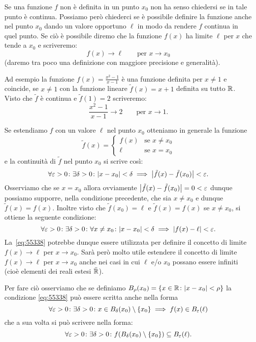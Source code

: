 Se una funzione $f$ non è definita in un punto $x_0$ non ha senso chiedersi
se in tale punto è continua. 
Possiamo però chiederci se è possibile definire la funzione anche nel punto 
$x_0$ dando un valore opportuno $\ell$ in modo da rendere $f$ continua 
in quel punto. 
Se ciò è possibile diremo che la funzione $f(x)$ ha limite $\ell$ 
per $x$ che tende a $x_0$ e scriveremo:
\[
  f(x) \to \ell \qquad \text{per $x\to x_0$}
\]
(daremo tra poco una definizione con maggiore precisione e generalità).

Ad esempio la funzione $f(x) = \frac{x^2-1}{x-1}$ è una funzione definita per $x\neq 1$
e coincide, se $x\neq 1$ con la funzione lineare $\tilde f(x) = x+1$ definita 
su tutto ${\mathbb R}$. 
Visto che $\tilde f$ è continua e $\tilde f(1)=2$
scriveremo:
\[
  \frac{x^2-1}{x-1} \to 2
  \qquad \text{per $x\to 1$.}
\]

Se estendiamo $f$ con un valore $\ell$ nel punto $x_0$ otteniamo 
in generale la funzione 
\[
  \tilde f(x) = \begin{cases}
    f(x) & \text{se $x\neq x_0$}\\
    \ell & \text{se $x=x_0$}
  \end{cases}  
\]
e la continuità di $\tilde f$ nel punto $x_0$ si scrive così:
\[
\forall\varepsilon>0\colon \exists \delta>0\colon
{\left|x-x_0\right|}<\delta \implies {\left|\tilde f(x)-\tilde f(x_0)\right|}<\varepsilon.  
\]
Osserviamo che se $x=x_0$ allora ovviamente ${\left|\tilde f(x)-\tilde f(x_0)\right|}
= 0 < \varepsilon$ dunque possiamo supporre, nella condizione precedente, 
che sia $x\neq x_0$ e dunque $\tilde f(x)=f(x)$. 
Inoltre visto che $\tilde f(x_0)=\ell$ 
e $\tilde f(x)=f(x)$ se $x\neq x_0$,
si ottiene 
la seguente condizione:
\begin{equation}\label{eq:55338}
\forall \varepsilon>0\colon \exists \delta >0 \colon 
  \forall x\neq x_0\colon
  {\left|x-x_0\right|}<\delta \implies {\left|f(x) - \ell\right|} < \varepsilon.
\end{equation}
La~\eqref{eq:55338} potrebbe dunque essere utilizzata per definire 
il concetto di limite $f(x)\to \ell$ per $x\to x_0$.
Sarà però molto utile estendere il concetto di limite $f(x)\to \ell$ 
per $x\to x_0$ anche nei casi in cui $\ell$ e/o $x_0$ possano 
essere infiniti (cioè elementi dei reali estesi $\bar {{\mathbb R}}$).

Per fare ciò osserviamo che
se definiamo%
$B_\rho(x_0) = {\left\{ x\in {\mathbb R} \colon {\left|x-x_0\right|}<\rho \right\}}$
la condizione \eqref{eq:55338}
può essere scritta anche nella forma 
\[
  \forall \varepsilon>0\colon \exists \delta >0 \colon 
  x \in B_\delta(x_0)\setminus{\left\{ x_0 \right\}} \implies f(x) \in B_\varepsilon(\ell)  
\]
che a sua volta si può scrivere nella forma:
\[
  \forall \varepsilon>0\colon \exists \delta >0 \colon 
  f(B_\delta(x_0)\setminus{\left\{ x_0 \right\}}) \subseteq  B_\varepsilon(\ell).    
\]

